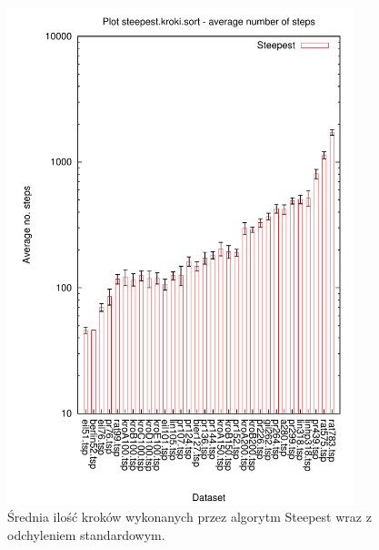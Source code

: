 \begin{figure}
\begin{center}
\includegraphics[width=0.9\textwidth]{wykresy/steepest_kroki}
\end{center}
\caption{Średnia ilość kroków wykonanych przez algorytm Steepest wraz z odchyleniem standardowym.}
\label{steepest_kroki}
\end{figure}


